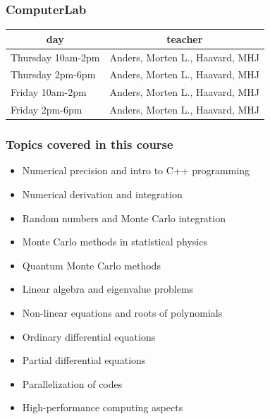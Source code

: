 \documentclass{beamer}
\begin{document}
\begin{frame}
\frametitle{ComputerLab}

\begin{block}{}


{\footnotesize
\begin{tabular}{ll}
\hline
\multicolumn{1}{c}{ day } & \multicolumn{1}{c}{ teacher } \\
\hline
Thursday 10am-2pm & Anders, Morten L., Haavard, MHJ \\
Thursday 2pm-6pm  & Anders, Morten L., Haavard, MHJ \\
Friday 10am-2pm   & Anders, Morten L., Haavard, MHJ \\
Friday 2pm-6pm    & Anders, Morten L., Haavard, MHJ \\
\hline
\end{tabular}
}

\noindent
\end{block}
\end{frame}

\begin{frame}
\frametitle{Topics covered in this course}

\begin{block}{}
\begin{itemize}
  \item Numerical precision and intro to C++ programming

  \item Numerical derivation and integration

  \item Random numbers and Monte Carlo integration

  \item Monte Carlo methods in statistical physics

  \item Quantum Monte Carlo methods

  \item Linear algebra and eigenvalue problems

  \item Non-linear equations and roots of polynomials

  \item Ordinary differential equations

  \item Partial differential equations

  \item Parallelization of codes

  \item High-performance computing aspects
\end{itemize}

\noindent
\end{block}
\end{frame}
\end{document}
